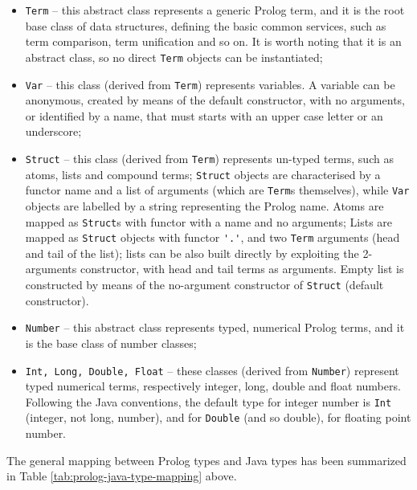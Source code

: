 %
\begin{itemize}
    \item \texttt{Term} -- this abstract class represents a generic Prolog term, and it is the
    root base class of \tuprolog{} data structures, defining the basic common services, such
    as term comparison, term unification and so on.
    It is worth noting that it is an abstract class, so no direct \texttt{Term}
    objects can be instantiated;
    \item \texttt{Var} -- this class (derived from \texttt{Term})
    represents \tuprolog{} variables.
    A variable can be anonymous, created by means of the default constructor, with no
    arguments, or identified by a name, that must starts with an upper case letter or an
    underscore;
    \item \texttt{Struct} -- this class (derived from \texttt{Term})
    represents un-typed \tuprolog{} terms, such as atoms, lists and compound terms;
    \texttt{Struct} objects are characterised by a functor name and a
    list of arguments (which are \texttt{Term}s themselves), while
    \texttt{Var} objects are labelled by a string representing the
    Prolog name.
    Atoms are mapped as \texttt{Struct}s with functor with a name and
    no arguments;
    Lists are mapped as \texttt{Struct} objects with functor
    \verb|'.'|, and two \texttt{Term} arguments (head and tail of the list);
    lists can be also built directly by exploiting the 2-arguments constructor, with
    head and tail terms as arguments.
    Empty list is constructed by means of the no-argument constructor of \texttt{Struct}
    (default constructor).
    \item \texttt{Number} -- this abstract class represents typed, numerical Prolog terms,
        and it is the  base class of \tuprolog{} number classes;
    \item \texttt{Int, Long, Double, Float} -- these classes (derived from \texttt{Number})
    represent  typed numerical \tuprolog{} terms, respectively integer, long, double and
    float numbers.
    Following the Java conventions, the default type for integer number is \texttt{Int}
    (integer, not long, number), and for \texttt{Double} (and so double), for floating point
    number.
\end{itemize}


The general mapping between Prolog types and Java types has been summarized in Table \ref{tab:prolog-java-type-mapping} above. 

